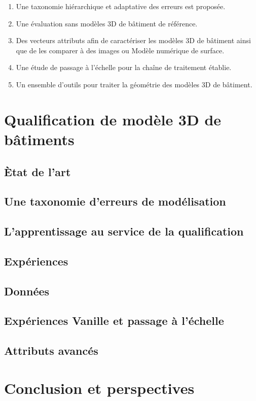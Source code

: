         \begin{enumerate}
            \item Une taxonomie hiérarchique et adaptative des erreurs est proposée.
            \item Une évaluation sans modèles 3D de bâtiment de référence.
            \item Des vecteurs attributs afin de caractériser les modèles 3D de bâtiment ainsi que de les comparer à des images ou Modèle numérique de surface.
            \item Une étude de passage à l'échelle pour la chaîne de traitement établie.
            \item Un ensemble d'outils pour traiter la géométrie des modèles 3D de bâtiment.
        \end{enumerate}

\section*{Qualification de modèle 3D de bâtiments}


    \subsection*{\`Etat de l'art}

    \subsection*{Une taxonomie d'erreurs de modélisation}

    \subsection*{L'apprentissage au service de la qualification}

\subsection*{Expériences}

    \subsection*{Données}

    \subsection*{Expériences Vanille et passage à l'échelle}

    \subsection*{Attributs avancés}

\section*{Conclusion et perspectives}

